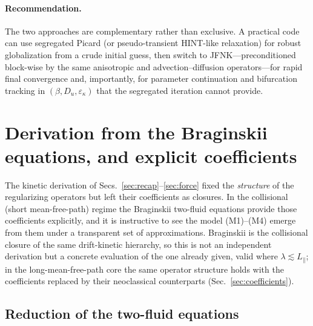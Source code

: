 \documentclass[english]{article}
\begin{document}
\paragraph{Recommendation.}
The two approaches are complementary rather than exclusive. A practical code can use segregated
Picard (or pseudo-transient HINT-like relaxation) for robust globalization from a crude initial
guess, then switch to JFNK---preconditioned block-wise by the same anisotropic and
advection--diffusion operators---for rapid final convergence and, importantly, for parameter
continuation and bifurcation tracking in $(\beta,D_u,\varepsilon_\kappa)$ that the segregated
iteration cannot provide.

\section{Derivation from the Braginskii equations, and explicit coefficients}
\label{sec:braginskii}

The kinetic derivation of Secs.~\ref{sec:recap}--\ref{sec:force} fixed the \emph{structure} of the
regularizing operators but left their coefficients as closures. In the collisional (short
mean-free-path) regime the Braginskii two-fluid equations \cite{braginskii1965} provide those
coefficients explicitly, and it is instructive to see the model (M1)--(M4) emerge from them under a
transparent set of approximations. Braginskii is the collisional closure of the same drift-kinetic
hierarchy, so this is not an independent derivation but a concrete evaluation of the one already
given, valid where $\lambda\lesssim L_\parallel$; in the long-mean-free-path core the same operator
structure holds with the coefficients replaced by their neoclassical counterparts
(Sec.~\ref{sec:coefficients}).

\subsection{Reduction of the two-fluid equations}
\label{sec:reduction}
\end{document}
